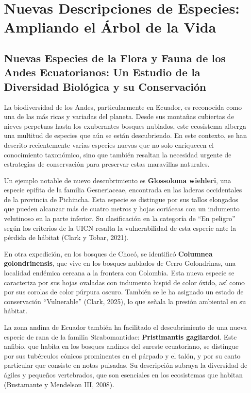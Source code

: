 \documentclass[
  letterpaper,
  DIV=11,
  numbers=noendperiod,
  oneside]{scrreprt}
\begin{document}
\chapter{Nuevas Descripciones de Especies: Ampliando el Árbol de la
Vida}\label{nuevas-descripciones-de-especies-ampliando-el-uxe1rbol-de-la-vida}

\section{Nuevas Especies de la Flora y Fauna de los Andes Ecuatorianos:
Un Estudio de la Diversidad Biológica y su
Conservación}\label{nuevas-especies-de-la-flora-y-fauna-de-los-andes-ecuatorianos-un-estudio-de-la-diversidad-bioluxf3gica-y-su-conservaciuxf3n}

La biodiversidad de los Andes, particularmente en Ecuador, es reconocida
como una de las más ricas y variadas del planeta. Desde sus montañas
cubiertas de nieves perpetuas hasta los exuberantes bosques nublados,
este ecosistema alberga una multitud de especies que aún se están
descubriendo. En este contexto, se han descrito recientemente varias
especies nuevas que no solo enriquecen el conocimiento taxonómico, sino
que también resaltan la necesidad urgente de estrategias de conservación
para preservar estas maravillas naturales.

Un ejemplo notable de nuevo descubrimiento es \textbf{Glossoloma
wiehleri}, una especie epifita de la familia Gesneriaceae, encontrada en
las laderas occidentales de la provincia de Pichincha. Esta especie se
distingue por sus tallos elongados que pueden alcanzar más de cuatro
metros y hojas coriáceas con un indumento velutinoso en la parte
inferior. Su clasificación en la categoría de ``En peligro'' según los
criterios de la UICN resalta la vulnerabilidad de esta especie ante la
pérdida de hábitat (Clark y Tobar, 2021).

En otra expedición, en los bosques de Chocó, se identificó
\textbf{Columnea golondrinensis}, que vive en los bosques nublados de
Cerro Golondrinas, una localidad endémica cercana a la frontera con
Colombia. Esta nueva especie se caracteriza por sus hojas ovaladas con
indumento hispid de color óxido, así como por sus corolas de color
púrpura oscuro. También se le ha asignado un estado de conservación
``Vulnerable'' (Clark, 2025), lo que señala la presión ambiental en su
hábitat.

La zona andina de Ecuador también ha facilitado el descubrimiento de una
nueva especie de rana de la familia Strabomantidae: \textbf{Pristimantis
gagliardoi}. Este anfibio, que habita en los bosques andinos del sureste
ecuatoriano, se distingue por sus tubérculos cónicos prominentes en el
párpado y el talón, y por su canto particular que consiste en notas
pulsadas. Su descripción subraya la diversidad de ágiles y pequeños
vertebrados, que son esenciales en los ecosistemas que habitan
(Bustamante y Mendelson III, 2008).
\end{document}
